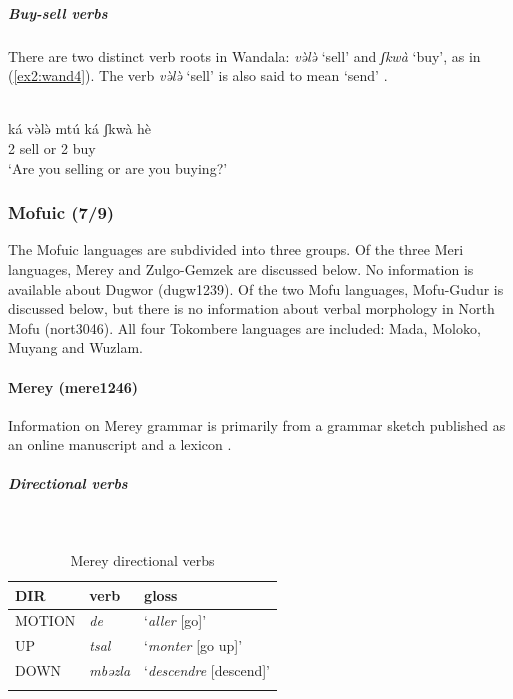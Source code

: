 \subparagraph{Buy-sell verbs}

There are two distinct verb roots in Wandala: \textit{və̀lə̀} `sell' and \textit{ʃkwà} `buy', as in (\ref{ex2:wand4}). The verb \textit{və̀lə̀} `sell' is also said to mean `send' \citep[155]{frajzyngierGrammarWandala2012}.

\ea\label{ex2:wand4}
 \\
\gll ká və̀lə̀ mtú ká ʃkwà hè \\
2 sell or 2 buy  \\
\glt `Are you selling or are you buying?'
\z 

\subsubsection{Mofuic (7/9)}

The Mofuic languages are subdivided into three groups. Of the three Meri languages, Merey and Zulgo-Gemzek are discussed below. No information is available about Dugwor (dugw1239). Of the two Mofu languages, Mofu-Gudur is discussed below, but there is no information about verbal morphology in North Mofu (nort3046). All four Tokombere languages are included: Mada, Moloko, Muyang and Wuzlam. 

\paragraph*{Merey (mere1246)} \label{mere}

Information on Merey grammar is primarily from a grammar sketch published as an online manuscript \citep{gravinaVerbPhraseMerey2007} and a lexicon \citep{gravinaMereyProvisionalLexicon2003}.

\newpage
\subparagraph{Directional verbs}~

\begin{table}[H]
	\caption{Merey directional verbs} 
	\label{tab:mereV}
	\begin{tabular}{lll} %
		\lsptoprule
		DIR & verb & gloss   \\ %
		\midrule
		MOTION & \textit{de} & `\textit{aller} [go]' \\
		UP & \textit{tsal} & `\textit{monter} [go up]' \\
		DOWN & \textit{mbəzla} & `\textit{descendre} [descend]' \\
		\lspbottomrule
	\end{tabular}
\end{table}

